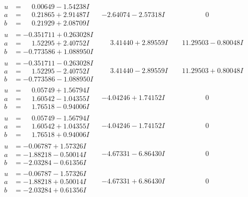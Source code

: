 \documentclass[1p]{elsarticle_modified}
\theoremstyle{definition}
\begin{document}
$$\begin{array}{c|c|c}
\begin{aligned}
u &= \phantom{-}0.00649 - 1.54238 I \\
a &= \phantom{-}0.21865 + 2.91487 I \\
b &= \phantom{-}0.21929 + 2.08709 I\end{aligned}
 & -2.64074 - 2.57318 I & \phantom{-0.000000 } 0 \\ \hline\begin{aligned}
u &= -0.351711 + 0.263028 I \\
a &= \phantom{-}1.52295 + 2.40752 I \\
b &= -0.773586 + 1.088950 I\end{aligned}
 & \phantom{-}3.41440 + 2.89559 I & \phantom{-}11.29503 - 0.80048 I \\ \hline\begin{aligned}
u &= -0.351711 - 0.263028 I \\
a &= \phantom{-}1.52295 - 2.40752 I \\
b &= -0.773586 - 1.088950 I\end{aligned}
 & \phantom{-}3.41440 - 2.89559 I & \phantom{-}11.29503 + 0.80048 I \\ \hline\begin{aligned}
u &= \phantom{-}0.05749 + 1.56794 I \\
a &= \phantom{-}1.60542 - 1.04355 I \\
b &= \phantom{-}1.76518 - 0.94006 I\end{aligned}
 & -4.04246 + 1.74152 I & \phantom{-0.000000 } 0 \\ \hline\begin{aligned}
u &= \phantom{-}0.05749 - 1.56794 I \\
a &= \phantom{-}1.60542 + 1.04355 I \\
b &= \phantom{-}1.76518 + 0.94006 I\end{aligned}
 & -4.04246 - 1.74152 I & \phantom{-0.000000 } 0 \\ \hline\begin{aligned}
u &= -0.06787 + 1.57326 I \\
a &= -1.88218 - 0.50014 I \\
b &= -2.03284 - 0.61356 I\end{aligned}
 & -4.67331 - 6.86430 I & \phantom{-0.000000 } 0 \\ \hline\begin{aligned}
u &= -0.06787 - 1.57326 I \\
a &= -1.88218 + 0.50014 I \\
b &= -2.03284 + 0.61356 I\end{aligned}
 & -4.67331 + 6.86430 I & \phantom{-0.000000 } 0\\

\end{array}$$
\end{document}
